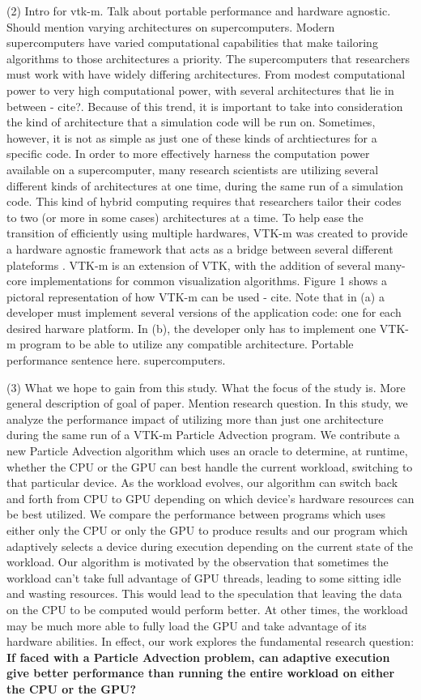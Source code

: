 \documentclass{IEEEtran}
\begin{document}
(2) Intro for vtk-m. Talk about portable performance and hardware agnostic. Should mention varying architectures on supercomputers.
%
Modern supercomputers have varied computational capabilities that make tailoring algorithms to those architectures a priority.
%
The supercomputers that researchers must work with have widely differing architectures.
%
From modest computational power to very high computational power, with several architectures that lie in between - cite?.
%
Because of this trend, it is important to take into consideration the kind of architecture that a simulation code will be run on. 
%
Sometimes, however, it is not as simple as just one of these kinds of archtiectures for a specific code.
%
In order to more effectively harness the computation power available on a supercomputer, many research scientists are utilizing several different kinds of architectures at one time, during the same run of a simulation code.
%
This kind of hybrid computing requires that researchers tailor their codes to two (or more in some cases)  architectures at a time.
%
To help ease the transition of efficiently using multiple hardwares, VTK-m was created to provide a hardware agnostic framework that acts as a bridge between several different plateforms \cite{Camp13}.
%
VTK-m is an extension of VTK, with the addition of several many-core implementations for common visualization algorithms.
%
Figure 1 shows a pictoral representation of how VTK-m can be used - cite. 
%
Note that in (a) a developer must implement several versions of the application code: one for each desired harware platform.
%
In (b), the developer only has to implement one VTK-m program to be able to utilize any compatible architecture.
%
Portable performance sentence here.
%
supercomputers.

(3) What we hope to gain from this study. What the focus of the study is. More general description of goal of paper. 
Mention research question.
%
In this study, we analyze the performance impact of utilizing more than just one architecture during the same run of a VTK-m Particle Advection program.
%
We contribute a new Particle Advection algorithm which uses an oracle to determine, at runtime, whether the CPU or the GPU can best handle the current workload, switching to that particular device.
%
As the workload evolves, our algorithm can switch back and forth from CPU to GPU depending on which device's hardware resources can be best utilized.
%
We compare the performance between programs which uses either only the CPU or only the GPU to produce results and our program which adaptively selects a device during execution depending on the current state of the workload. 
%
Our algorithm is motivated by the observation that sometimes the workload can't take full advantage of GPU threads, leading to some sitting idle and wasting resources.
%
This would lead to the speculation that leaving the data on the CPU to be computed would perform better.
%
At other times, the workload may be much more able to fully load the GPU and take advantage of its hardware abilities.
%
In effect, our work explores the fundamental research question: \textbf{If faced with a Particle Advection problem, can adaptive execution give better performance than running the entire workload on either the CPU or the GPU?}
\end{document}
